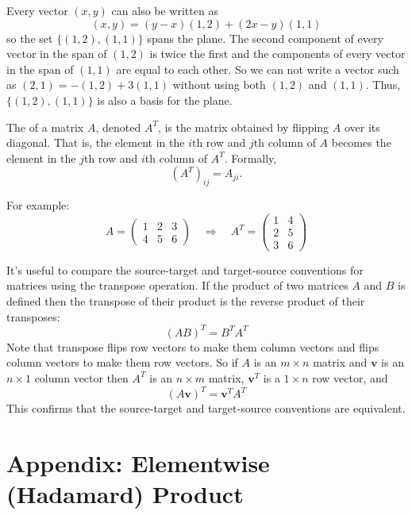    Every vector $(x,y)$ can also be written as
\[
 (x,y) =(y-x)(1,2) +(2x-y)(1,1)
\]
so the set $\{ (1,2), (1,1) \}$ spans the plane. The second component of every
vector in the span of $(1,2)$ is twice the first and the components of every 
vector in the span of $(1,1)$ are equal to each other. So we can not write a
vector such as $(2,1) = -(1,2)+3 (1,1)$ without using both $(1,2)$ and $(1,1)$.
Thus, $\{ (1,2), (1,1) \}$ is also a basis for the plane. 

The  of a matrix \( A \), denoted \( A^T \), is the matrix obtained by flipping \( A \) over its diagonal. That is, the element in the \( i \)th row and \( j \)th column of \( A \) becomes the element in the \( j \)th row and \( i \)th column of \( A^T \). Formally, 
\[
(A^T)_{ij} = A_{ji}.
\]

For example: 
\[
A = \begin{pmatrix}
1 & 2 & 3 \\
4 & 5 & 6
\end{pmatrix}
\quad \Rightarrow \quad
A^T = \begin{pmatrix}
1 & 4 \\
2 & 5 \\
3 & 6
\end{pmatrix}
\]

   It's useful to compare the source-target and target-source conventions for
matrices using the transpose operation. If the product of two matrices $A$ and 
$B$ is defined then the transpose of their product is the reverse product of 
their transposes:
\begin{equation*}
       \left(AB\right)^T = B^T A^T                 
\end{equation*}
Note that transpose flips row vectors to make them column vectors and flips
column vectors to make them row vectors. So if $A$ is an $m \times n$ matrix 
and $\mathbf{v}$ is an $n \times 1$ column vector then $A^T$ is an $n \times m$
matrix, $\mathbf{v}^T$ is a $1 \times n$ row vector, and
\begin{equation*}
       \left(A \mathbf{v} \right)^T =  \mathbf{v}^T A^T                 
\end{equation*}
This confirms that the source-target and target-source conventions are
equivalent.

\section{Appendix: Elementwise (Hadamard) Product}\label{hadamard}

